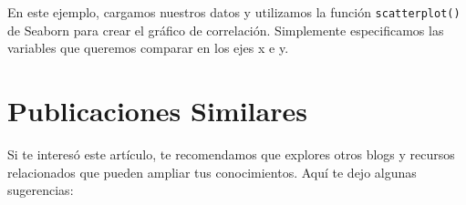 \documentclass[
  a4paper,
]{article}
\begin{document}
En este ejemplo, cargamos nuestros datos y utilizamos la función
\texttt{scatterplot()} de Seaborn para crear el gráfico de correlación.
Simplemente especificamos las variables que queremos comparar en los
ejes x e y.

\hypertarget{publicaciones-similares}{%
\section{Publicaciones Similares}\label{publicaciones-similares}}

Si te interesó este artículo, te recomendamos que explores otros blogs y
recursos relacionados que pueden ampliar tus conocimientos. Aquí te dejo
algunas sugerencias:


\printbibliography
\end{document}
